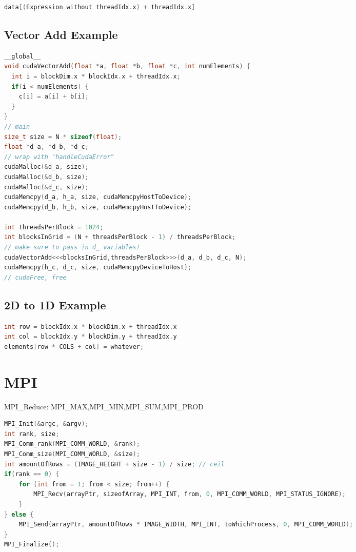 \begin{multicols*}{4}
	\begin{lstlisting}[language=c]
data[(Expression without threadIdx.x) + threadIdx.x]
\end{lstlisting}

	\subsection{Vector Add Example}
	\begin{lstlisting}[language=c]
__global__
void cudaVectorAdd(float *a, float *b, float *c, int numElements) {
  int i = blockDim.x * blockIdx.x + threadIdx.x;
  if(i < numElements) {
    c[i] = a[i] + b[i];
  }
}
// main
size_t size = N * sizeof(float);
float *d_a, *d_b, *d_c;
// wrap with "handleCudaError"
cudaMalloc(&d_a, size);
cudaMalloc(&d_b, size);
cudaMalloc(&d_c, size);
cudaMemcpy(d_a, h_a, size, cudaMemcpyHostToDevice);
cudaMemcpy(d_b, h_b, size, cudaMemcpyHostToDevice);

int threadsPerBlock = 1024;
int blocksInGrid = (N + threadsPerBlock - 1) / threadsPerBlock;
// make sure to pass in d_ variables!
cudaVectorAdd<<<blocksInGrid,threadsPerBlock>>>(d_a, d_b, d_c, N);
cudaMemcpy(h_c, d_c, size, cudaMemcpyDeviceToHost);
// cudaFree, free
\end{lstlisting}

\subsection{2D to 1D Example}
\begin{lstlisting}[language=c]
int row = blockIdx.x * blockDim.x + threadIdx.x
int col = blockIdx.y * blockDim.y + threadIdx.y
elements[row * COLS + col] = whatever;
\end{lstlisting}

\section{MPI}
MPI\_Reduce: MPI\_MAX,MPI\_MIN,MPI\_SUM,MPI\_PROD

    \begin{lstlisting}[language=c]
MPI_Init(&argc, &argv);
int rank, size;
MPI_Comm_rank(MPI_COMM_WORLD, &rank);
MPI_Comm_size(MPI_COMM_WORLD, &size);
int amountOfRows = (IMAGE_HEIGHT + size - 1) / size; // ceil
if(rank == 0) {
	for (int from = 1; from < size; from++) {
		MPI_Recv(arrayPtr, sizeofArray, MPI_INT, from, 0, MPI_COMM_WORLD, MPI_STATUS_IGNORE);
	}
} else {
	MPI_Send(arrayPtr, amountOfRows * IMAGE_WIDTH, MPI_INT, toWhichProcess, 0, MPI_COMM_WORLD);
}
MPI_Finalize();
\end{lstlisting}

\end{multicols*}
